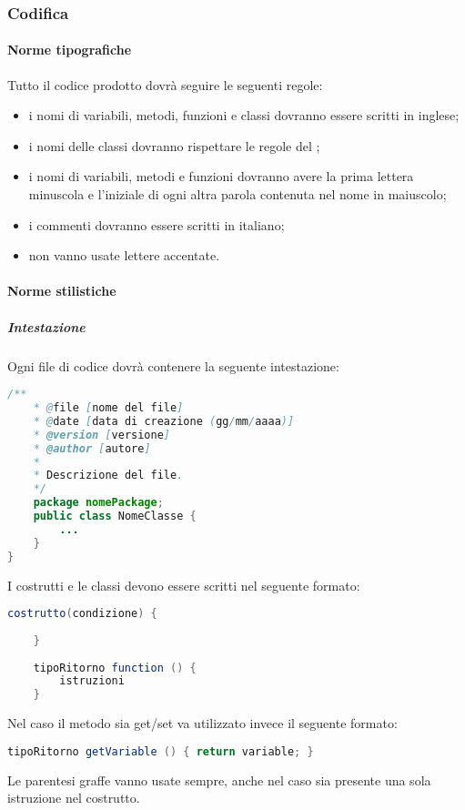 \subsubsection{Codifica}
\label{sec:2.1.4}
	\paragraph{Norme tipografiche}
	\label{sec:2.1.4.1}
			Tutto il codice prodotto dovrà seguire le seguenti regole:
			\begin{itemize}
				\item i nomi di variabili, metodi, funzioni e classi dovranno essere scritti in inglese;
				\item i nomi delle classi dovranno rispettare le regole del ;
				\item i nomi di variabili, metodi e funzioni dovranno avere la prima lettera minuscola e l'iniziale di ogni altra parola contenuta nel nome in maiuscolo;
				\item i commenti dovranno essere scritti in italiano;
				\item non vanno usate lettere accentate.
		\end{itemize}
		\paragraph{Norme stilistiche}
		\label{codNormeStilistiche}
			\subparagraph{Intestazione}
			Ogni file di codice dovrà contenere la seguente intestazione:
			\begin{lstlisting}[language=Java, commentstyle=\color{green}, keywordstyle=\color{blue}]
	/**
	* @file [nome del file]
	* @date [data di creazione (gg/mm/aaaa)]
	* @version [versione]
	* @author [autore]
	*
	* Descrizione del file.
	*/
	package nomePackage;
	public class NomeClasse {
		...
	}
}
			\end{lstlisting}
			I costrutti e le classi devono essere scritti nel seguente formato:
			\begin{lstlisting}[language=Java, commentstyle=\color{green}, keywordstyle=\color{blue}]
	costrutto(condizione) {
	
	}
	
	tipoRitorno function () { 
		istruzioni
	}	
			\end{lstlisting}
				Nel caso il metodo sia get/set va utilizzato invece il seguente formato:
			\begin{lstlisting}[language=Java, commentstyle=\color{green}, keywordstyle=\color{blue}]
	tipoRitorno getVariable () { return variable; }
		\end{lstlisting}
		Le parentesi graffe vanno usate sempre, anche nel caso sia presente una sola istruzione nel costrutto.
